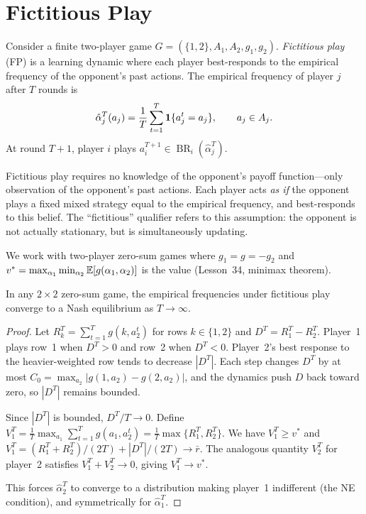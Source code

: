 \documentclass[11pt,a4paper]{article}
\DeclareMathOperator{\BR}{BR}
\begin{document}

\section{Fictitious Play}
\label{sec:fictitious-play}

\begin{definition}
\label{def:fictitious-play}
Consider a finite two-player game $G = (\{1,2\}, A_1, A_2, g_1, g_2)$.
\emph{Fictitious play} (FP) is a learning dynamic where each player
best-responds to the empirical frequency of the opponent's past actions.
The empirical frequency of player $j$ after $T$ rounds is
\[
    \hat{\alpha}_j^T(a_j) = \frac{1}{T} \sum_{t=1}^T
    \mathbf{1}\{a_j^t = a_j\}, \qquad a_j \in A_j.
\]
At round $T+1$, player $i$ plays
$a_i^{T+1} \in \BR_i(\hat{\alpha}_j^T)$.
\end{definition}

\begin{remark}
Fictitious play requires no knowledge of the opponent's payoff function---only
observation of the opponent's past actions. Each player acts \emph{as if}
the opponent plays a fixed mixed strategy equal to the empirical frequency,
and best-responds to this belief. The ``fictitious'' qualifier refers to
this assumption: the opponent is not actually stationary, but is
simultaneously updating.
\end{remark}

We work with two-player zero-sum games where $g_1 = g = -g_2$ and
$v^* = \max_{\alpha_1}\min_{\alpha_2}\mathbb{E}[g(\alpha_1,\alpha_2)]$ is the
value (Lesson~34, minimax theorem).

\begin{theorem}
\label{thm:fp-2x2}
In any $2 \times 2$ zero-sum game, the empirical frequencies under
fictitious play converge to a Nash equilibrium as $T \to \infty$.
\end{theorem}

\begin{proof}
Let $R_k^T = \sum_{t=1}^T g(k, a_2^t)$ for rows $k \in \{1,2\}$ and
$D^T = R_1^T - R_2^T$. Player~1 plays row~1 when $D^T > 0$ and row~2
when $D^T < 0$. Player~2's best response to the heavier-weighted row
tends to decrease $|D^T|$. Each step changes $D^T$ by at most
$C_0 = \max_{a_2}|g(1,a_2) - g(2,a_2)|$, and the dynamics push $D$
back toward zero, so $|D^T|$ remains bounded.

Since $|D^T|$ is bounded, $D^T/T \to 0$. Define
$V_1^T = \frac{1}{T}\max_{a_1}\sum_{t=1}^T g(a_1, a_2^t)
= \frac{1}{T}\max\{R_1^T, R_2^T\}$. We have $V_1^T \geq v^*$ and
$V_1^T = (R_1^T + R_2^T)/(2T) + |D^T|/(2T) \to \bar{r}$. The
analogous quantity $V_2^T$ for player~2 satisfies
$V_1^T + V_2^T \to 0$, giving $V_1^T \to v^*$.

This forces $\hat{\alpha}_2^T$ to converge to a distribution making
player~1 indifferent (the NE condition), and symmetrically for
$\hat{\alpha}_1^T$.
\end{proof}
\end{document}
